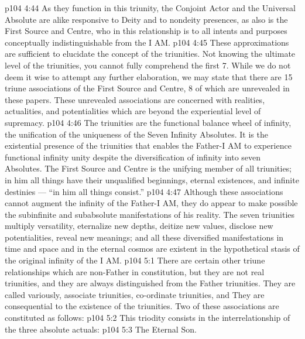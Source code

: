 \vs p104 4:44 As they function in this triunity, the Conjoint Actor and the Universal Absolute are alike responsive to Deity and to nondeity presences, as also is the First Source and Centre, who in this relationship is to all intents and purposes conceptually indistinguishable from the I AM.
\vs p104 4:45 \pc These approximations are sufficient to elucidate the concept of the triunities. Not knowing the ultimate level of the triunities, you cannot fully comprehend the first 7. While we do not deem it wise to attempt any further elaboration, we may state that there are 15 triune associations of the First Source and Centre, 8 of which are unrevealed in these papers. These unrevealed associations are concerned with realities, actualities, and potentialities which are beyond the experiential level of supremacy.
\vs p104 4:46 The triunities are the functional balance wheel of infinity, the unification of the uniqueness of the Seven Infinity Absolutes. It is the existential presence of the triunities that enables the Father\hyp{}I AM to experience functional infinity unity despite the diversification of infinity into seven Absolutes. The First Source and Centre is the unifying member of all triunities; in him all things have their unqualified beginnings, eternal existences, and infinite destinies --- “in him all things consist.”
\vs p104 4:47 Although these associations cannot augment the infinity of the Father\hyp{}I AM, they do appear to make possible the subinfinite and subabsolute manifestations of his reality. The seven triunities multiply versatility, eternalize new depths, deitize new values, disclose new potentialities, reveal new meanings; and all these diversified manifestations in time and space and in the eternal cosmos are existent in the hypothetical stasis of the original infinity of the I AM.
\vs p104 5:1 There are certain other triune relationships which are non\hyp{}Father in constitution, but they are not real triunities, and they are always distinguished from the Father triunities. They are called variously, associate triunities, co\hyp{}ordinate triunities, and  They are consequential to the existence of the triunities. Two of these associations are constituted as follows:
\vs p104 5:2  This triodity consists in the interrelationship of the three absolute actuals:
\vs p104 5:3 \bibnobreakspace The Eternal Son.
